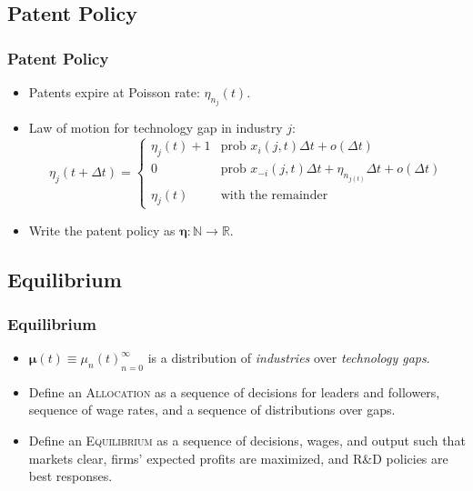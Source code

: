 \documentclass{beamer}
\begin{document}
\subsection{Patent Policy}
\label{sub:patent_policy}

\begin{frame}[t]\frametitle{Patent Policy}
  \begin{itemize}
    \item<+-> Patents expire at Poisson rate: $\eta_{n_j}(t)$.
    \item<+-> Law of motion for technology gap in industry $j$:
      \begin{equation*} \label{eq:tech_law_of_motion}
        \eta_j(t + \Delta t) =
        \begin{cases}
          \eta_j(t) + 1 & \textrm{prob } x_i(j,t)\Delta t + o(\Delta t)\\
          0 & \textrm{prob } x_{-i}(j,t)\Delta t + \eta_{n_{j(t)}}\Delta t + o(\Delta t) \\
          \eta_j(t) & \textrm{with the remainder} 
        \end{cases}
      \end{equation*}
  \item<+-> Write the patent policy as $\bm{\eta} : \mathbb{N} \rightarrow \mathbb{R}$.
  \end{itemize}
\end{frame}




\subsection{Equilibrium}
\label{sub:equilibrium}
\begin{frame}[t]\frametitle{Equilibrium} 
  \begin{itemize}

  \item<+-> $\bm{\mu}(t) \equiv {\mu_n(t)}_{n=0}^\infty$ is a distribution of \emph{industries} over \emph{technology gaps}.
  
  \item<+-> Define an \textsc{Allocation} as a sequence of decisions for leaders and followers, sequence of wage rates, and a sequence of distributions over gaps.

  \item<+-> Define an \textsc{Equilibrium} as a sequence of decisions, wages, and output such that markets clear, firms' expected profits are maximized, and R\&D policies are best responses. 

  \end{itemize}
\end{frame}
\end{document}
